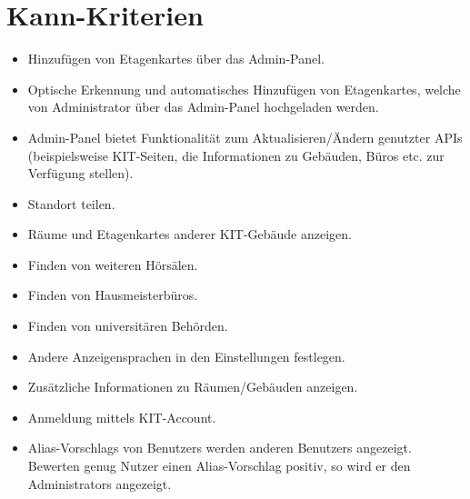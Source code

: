 \section{Kann-Kriterien}

\begin{itemize}

    \item Hinzufügen von \Glspl{Etagenkarte} über das \Gls{Admin-Panel}.
    \item Optische Erkennung und automatisches Hinzufügen von \Glspl{Etagenkarte},
          welche von \Gls{Administrator} über das \Gls{Admin-Panel} hochgeladen werden.
          
    \item \Gls{Admin-Panel} bietet Funktionalität zum Aktualisieren/Ändern genutzter \Gls{API}s (beispielsweise \Gls{KIT}-Seiten, die Informationen zu Gebäuden, Büros etc. zur Verfügung stellen).
    \item Standort teilen.
    \item Räume und \Glspl{Etagenkarte} anderer \Gls{KIT}-Gebäude anzeigen.
    \item Finden von weiteren Hörsälen.
    \item Finden von Hausmeisterbüros.
    \item Finden von universitären Behörden.
    \item Andere Anzeigensprachen in den Einstellungen festlegen.
    \item Zusätzliche Informationen zu Räumen/Gebäuden anzeigen.
    \item Anmeldung mittels \Gls{KIT}-Account.
    \item \Glspl{Alias-Vorschlag} von \Glspl{Benutzer} werden anderen \Glspl{Benutzer} angezeigt. Bewerten genug Nutzer einen 
    \Gls{Alias-Vorschlag} positiv, so wird er den \Glspl{Administrator} angezeigt.
    
        

\end{itemize}
